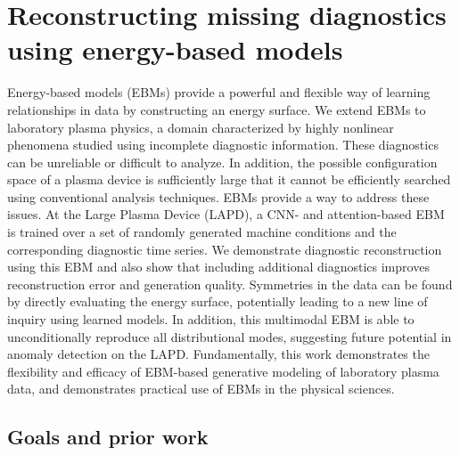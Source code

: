 \graphicspath{{Chapters/Chapter_ebm/}}

\chapter{Reconstructing missing diagnostics using energy-based models}
\label{ch:ebm}

 Energy-based models (EBMs) provide a powerful and flexible way of learning relationships in data by constructing an energy surface. We extend EBMs to laboratory plasma physics, a domain characterized by highly nonlinear phenomena studied using incomplete diagnostic information. These diagnostics can be unreliable or difficult to analyze. In addition, the possible configuration space of a plasma device is sufficiently large that it cannot be efficiently searched using conventional analysis techniques. EBMs provide a way to address these issues. At the Large Plasma Device (LAPD), a CNN- and attention-based EBM is trained over a set of randomly generated machine conditions and the corresponding diagnostic time series. We demonstrate diagnostic reconstruction using this EBM and also show that including additional diagnostics improves reconstruction error and generation quality.
  Symmetries in the data can be found by directly evaluating the energy surface, potentially leading to a new line of inquiry using learned models. In addition, this multimodal EBM is able to unconditionally reproduce all distributional modes, suggesting future potential in anomaly detection on the LAPD. Fundamentally, this work demonstrates the flexibility and efficacy of EBM-based generative modeling of laboratory plasma data, and demonstrates practical use of EBMs in the physical sciences.



\section{Goals and prior work}

